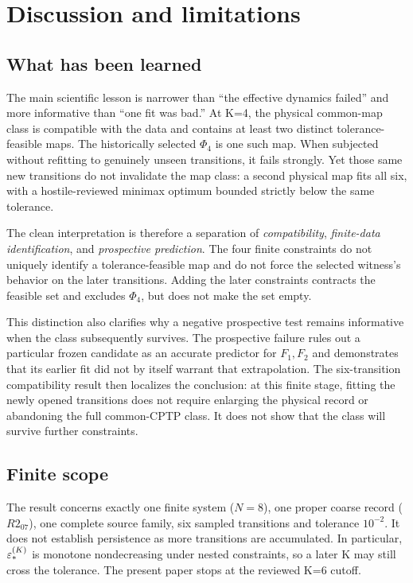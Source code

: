 \section{Discussion and limitations}
\label{sec:discussion}

\subsection{What has been learned}

The main scientific lesson is narrower than ``the effective dynamics failed'' and more informative than ``one fit was bad.''  At K=4, the physical common-map class is compatible with the data and contains at least two distinct tolerance-feasible maps.  The historically selected $\Phi_4$ is one such map.  When subjected without refitting to genuinely unseen transitions, it fails strongly.  Yet those same new transitions do not invalidate the map class: a second physical map fits all six, with a hostile-reviewed minimax optimum bounded strictly below the same tolerance.

The clean interpretation is therefore a separation of \emph{compatibility}, \emph{finite-data identification}, and \emph{prospective prediction}.  The four finite constraints do not uniquely identify a tolerance-feasible map and do not force the selected witness's behavior on the later transitions.  Adding the later constraints contracts the feasible set and excludes $\Phi_4$, but does not make the set empty.

This distinction also clarifies why a negative prospective test remains informative when the class subsequently survives.  The prospective failure rules out a particular frozen candidate as an accurate predictor for $F_1,F_2$ and demonstrates that its earlier fit did not by itself warrant that extrapolation.  The six-transition compatibility result then localizes the conclusion: at this finite stage, fitting the newly opened transitions does not require enlarging the physical record or abandoning the full common-CPTP class.  It does not show that the class will survive further constraints.

\subsection{Finite scope}

The result concerns exactly one finite system ($N=8$), one proper coarse record ($R2_{07}$), one complete source family, six sampled transitions and tolerance $10^{-2}$.  It does not establish persistence as more transitions are accumulated.  In particular, $\varepsilon_*^{(K)}$ is monotone nondecreasing under nested constraints, so a later K may still cross the tolerance.  The present paper stops at the reviewed K=6 cutoff.

